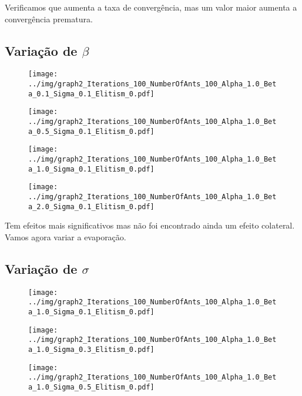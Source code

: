 Verificamos que aumenta a taxa de convergência, mas um valor maior aumenta a convergência prematura.  

\subsection*{Variação de $\beta$}

\begin{figure}[H]
  \centering
  \texttt{[image: ../img/graph2\_Iterations\_100\_NumberOfAnts\_100\_Alpha\_1.0\_Beta\_0.1\_Sigma\_0.1\_Elitism\_0.pdf]}
\end{figure}

\begin{figure}[H]
  \centering
  \texttt{[image: ../img/graph2\_Iterations\_100\_NumberOfAnts\_100\_Alpha\_1.0\_Beta\_0.5\_Sigma\_0.1\_Elitism\_0.pdf]}
\end{figure}

\begin{figure}[H]
  \centering
  \texttt{[image: ../img/graph2\_Iterations\_100\_NumberOfAnts\_100\_Alpha\_1.0\_Beta\_1.0\_Sigma\_0.1\_Elitism\_0.pdf]}
\end{figure}

\begin{figure}[H]
  \centering
  \texttt{[image: ../img/graph2\_Iterations\_100\_NumberOfAnts\_100\_Alpha\_1.0\_Beta\_2.0\_Sigma\_0.1\_Elitism\_0.pdf]}
\end{figure}

Tem efeitos mais significativos mas não foi encontrado ainda um efeito colateral. Vamos agora variar a evaporação.

\subsection*{Variação de $\sigma$}

\begin{figure}[H]
  \centering
  \texttt{[image: ../img/graph2\_Iterations\_100\_NumberOfAnts\_100\_Alpha\_1.0\_Beta\_1.0\_Sigma\_0.1\_Elitism\_0.pdf]}
\end{figure}

\begin{figure}[H]
  \centering
  \texttt{[image: ../img/graph2\_Iterations\_100\_NumberOfAnts\_100\_Alpha\_1.0\_Beta\_1.0\_Sigma\_0.3\_Elitism\_0.pdf]}
\end{figure}

\begin{figure}[H]
  \centering
  \texttt{[image: ../img/graph2\_Iterations\_100\_NumberOfAnts\_100\_Alpha\_1.0\_Beta\_1.0\_Sigma\_0.5\_Elitism\_0.pdf]}
\end{figure}

